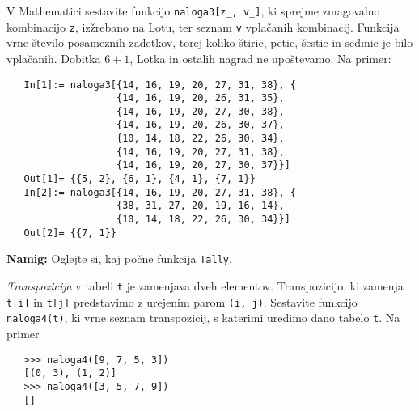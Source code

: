 \documentclass[arhiv]{izpit}
\begin{document}
V Mathematici sestavite funkcijo \verb|naloga3[z_, v_]|, ki sprejme zmagovalno kombinacijo \verb|z|, izžrebano na Lotu, ter seznam \verb|v| vplačanih kombinacij. Funkcija vrne število posameznih zadetkov, torej koliko štiric, petic, šestic in sedmic je bilo vplačanih. Dobitka $6 + 1$, Lotka in ostalih nagrad ne upoštevamo. Na primer:
%
{\small\begin{verbatim}
   In[1]:= naloga3[{14, 16, 19, 20, 27, 31, 38}, {
                   {14, 16, 19, 20, 26, 31, 35},
                   {14, 16, 19, 20, 27, 30, 38},
                   {14, 16, 19, 20, 26, 30, 37},
                   {10, 14, 18, 22, 26, 30, 34},
                   {14, 16, 19, 20, 27, 31, 38},
                   {14, 16, 19, 20, 27, 30, 37}}]
   Out[1]= {{5, 2}, {6, 1}, {4, 1}, {7, 1}}
   In[2]:= naloga3[{14, 16, 19, 20, 27, 31, 38}, {
                   {38, 31, 27, 20, 19, 16, 14},
                   {10, 14, 18, 22, 26, 30, 34}}]
   Out[2]= {{7, 1}}\end{verbatim}}
%
\noindent \textbf{Namig:} Oglejte si, kaj počne funkcija \verb|Tally|.



\naloga[25 točk]

\emph{Transpozicija} v tabeli \verb|t| je zamenjava dveh elementov. Transpozicijo, ki zamenja \verb|t[i]| in \verb|t[j]| predstavimo z urejenim parom \verb|(i, j)|.
Sestavite funkcijo \verb|naloga4(t)|, ki vrne seznam transpozicij, s katerimi uredimo dano tabelo \verb|t|. Na primer
%
{\small\begin{verbatim}
   >>> naloga4([9, 7, 5, 3])
   [(0, 3), (1, 2)]
   >>> naloga4([3, 5, 7, 9])
   []
\end{verbatim}}

\end{document}
